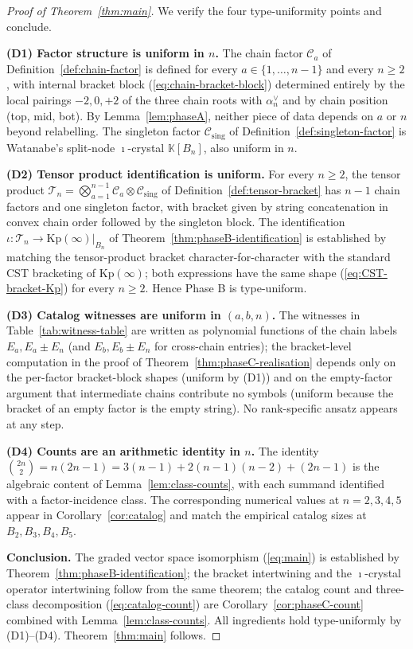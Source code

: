 \documentclass[11pt]{article}
\theoremstyle{definition}
\theoremstyle{remark}
\newcommand{\Kp}{\mathrm{Kp}}
\newcommand{\KK}{\mathbb{K}}
\newcommand{\Cmid}{\mathcal{C}}
\newcommand{\Csing}{\mathcal{C}_{\mathrm{sing}}}
\newcommand{\TT}{\mathcal{T}}
\begin{document}
\begin{proof}[Proof of Theorem~\ref{thm:main}]
We verify the four type-uniformity points and conclude.

\smallskip
\noindent\textbf{(D1) Factor structure is uniform in $n$.} The chain factor
$\Cmid_a$ of Definition~\ref{def:chain-factor} is defined for every
$a \in \{1, \ldots, n-1\}$ and every $n \geq 2$, with internal bracket block
(\ref{eq:chain-bracket-block}) determined entirely by the local pairings $-2, 0, +2$
of the three chain roots with $\alpha_n^\vee$ and by chain position (top, mid, bot).
By Lemma~\ref{lem:phaseA}, neither piece of data depends on $a$ or $n$ beyond
relabelling. The singleton factor $\Csing$ of Definition~\ref{def:singleton-factor}
is Watanabe's split-node $\imath$-crystal $\KK[B_n]$, also uniform in $n$.

\smallskip
\noindent\textbf{(D2) Tensor product identification is uniform.} For every
$n \geq 2$, the tensor product $\TT_n = \bigotimes_{a=1}^{n-1} \Cmid_a \otimes \Csing$
of Definition~\ref{def:tensor-bracket} has $n - 1$ chain factors and one
singleton factor, with bracket given by string concatenation in convex chain
order followed by the singleton block. The identification $\iota: \TT_n \to
\Kp(\infty)|_{B_n}$ of Theorem~\ref{thm:phaseB-identification} is established by
matching the tensor-product bracket character-for-character with the standard
CST bracketing of $\Kp(\infty)$; both expressions have the same shape
(\ref{eq:CST-bracket-Kp}) for every $n \geq 2$. Hence Phase B is type-uniform.

\smallskip
\noindent\textbf{(D3) Catalog witnesses are uniform in $(a, b, n)$.} The
witnesses in Table~\ref{tab:witness-table} are written as polynomial functions of
the chain labels $E_a, E_a \pm E_n$ (and $E_b, E_b \pm E_n$ for cross-chain
entries); the bracket-level computation in the proof of
Theorem~\ref{thm:phaseC-realisation} depends only on the per-factor bracket-block
shapes (uniform by (D1)) and on the empty-factor argument that intermediate
chains contribute no symbols (uniform because the bracket of an empty factor is
the empty string). No rank-specific ansatz appears at any step.

\smallskip
\noindent\textbf{(D4) Counts are an arithmetic identity in $n$.} The identity
$\binom{2n}{2} = n(2n - 1) = 3(n-1) + 2(n-1)(n-2) + (2n-1)$ is the algebraic
content of Lemma~\ref{lem:class-counts}, with each summand identified with a
factor-incidence class. The corresponding numerical values at $n = 2, 3, 4, 5$
appear in Corollary~\ref{cor:catalog} and match the empirical catalog sizes at
$B_2, B_3, B_4, B_5$.

\smallskip
\noindent\textbf{Conclusion.} The graded vector space isomorphism (\ref{eq:main})
is established by Theorem~\ref{thm:phaseB-identification}; the bracket
intertwining and the $\imath$-crystal operator intertwining follow from the same
theorem; the catalog count and three-class decomposition
(\ref{eq:catalog-count}) are Corollary~\ref{cor:phaseC-count} combined with
Lemma~\ref{lem:class-counts}. All ingredients hold type-uniformly by (D1)--(D4).
Theorem~\ref{thm:main} follows.
\end{proof}
\end{document}
